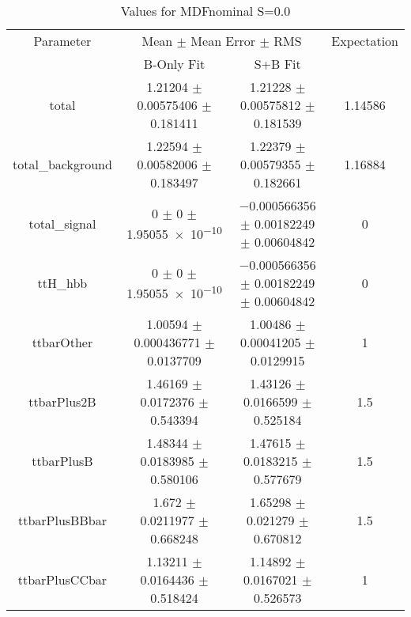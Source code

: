 \begin{table}
\centering
\caption{Values for MDFnominal S=0.0}
\begin{tabular}{cccc}
\toprule
Parameter & \multicolumn{2}{c}{Mean $\pm$ Mean Error $\pm$ RMS} & Expectation\\
 & B-Only Fit & S+B Fit & \\
\midrule
total & \num{1.21204} $\pm$ \num{0.00575406} $\pm$ \num{0.181411} & \num{1.21228} $\pm$ \num{0.00575812} $\pm$ \num{0.181539} & \num{1.14586}\\
total\_background & \num{1.22594} $\pm$ \num{0.00582006} $\pm$ \num{0.183497} & \num{1.22379} $\pm$ \num{0.00579355} $\pm$ \num{0.182661} & \num{1.16884}\\
total\_signal & \num{0} $\pm$ \num{0} $\pm$ \num{1.95055e-10} & \num{-0.000566356} $\pm$ \num{0.00182249} $\pm$ \num{0.00604842} & \num{0}\\
ttH\_hbb & \num{0} $\pm$ \num{0} $\pm$ \num{1.95055e-10} & \num{-0.000566356} $\pm$ \num{0.00182249} $\pm$ \num{0.00604842} & \num{0}\\
ttbarOther & \num{1.00594} $\pm$ \num{0.000436771} $\pm$ \num{0.0137709} & \num{1.00486} $\pm$ \num{0.00041205} $\pm$ \num{0.0129915} & \num{1}\\
ttbarPlus2B & \num{1.46169} $\pm$ \num{0.0172376} $\pm$ \num{0.543394} & \num{1.43126} $\pm$ \num{0.0166599} $\pm$ \num{0.525184} & \num{1.5}\\
ttbarPlusB & \num{1.48344} $\pm$ \num{0.0183985} $\pm$ \num{0.580106} & \num{1.47615} $\pm$ \num{0.0183215} $\pm$ \num{0.577679} & \num{1.5}\\
ttbarPlusBBbar & \num{1.672} $\pm$ \num{0.0211977} $\pm$ \num{0.668248} & \num{1.65298} $\pm$ \num{0.021279} $\pm$ \num{0.670812} & \num{1.5}\\
ttbarPlusCCbar & \num{1.13211} $\pm$ \num{0.0164436} $\pm$ \num{0.518424} & \num{1.14892} $\pm$ \num{0.0167021} $\pm$ \num{0.526573} & \num{1}\\
\bottomrule
\end{tabular}
\end{table}